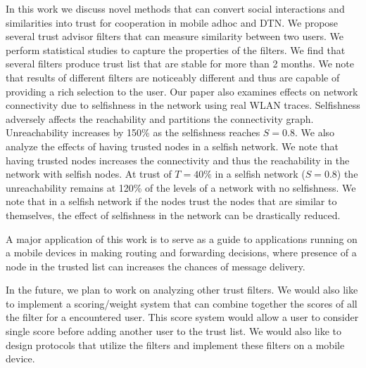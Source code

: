 \documentclass[10pt,conference]{IEEEtran}
\begin{document}
In this work we discuss novel methods that can convert social interactions and similarities into trust for cooperation in mobile adhoc and DTN. We propose several trust advisor filters that can measure similarity between two users. We perform statistical studies to capture the properties of the filters. We find that several filters produce trust list that are stable for more than 2 months. We note that results of different filters are noticeably different  and  thus are capable of providing a rich selection to the user.  Our paper  also examines effects on network connectivity due to selfishness in the network using real WLAN traces. Selfishness adversely affects the reachability and partitions the connectivity graph. Unreachability increases by 150\% as the selfishness reaches $S=0.8$. We also analyze the effects of having trusted nodes in a selfish network. We note that having trusted nodes increases the connectivity and thus the reachability in the network with selfish nodes. At trust of $T=40\%$ in a selfish network ($S=0.8$) the unreachability remains at 120\% of the levels of a network with no selfishness. We note that in a selfish network if the nodes trust the nodes that are similar to themselves, the effect of selfishness in the network can be drastically reduced. 

A major application of this work is to serve as a guide to applications running on  a mobile devices in making routing and forwarding decisions, where  presence of a node in the trusted list can increases the chances of message delivery.


In the future, we plan to work on analyzing other trust filters. We would also like to implement a scoring/weight system that can combine together the scores of all the filter for a encountered user. This score system would allow a user to consider single score before adding another user to the trust list. We would also like to design protocols that utilize the filters and implement these filters on a mobile device.








	
\end{document}
